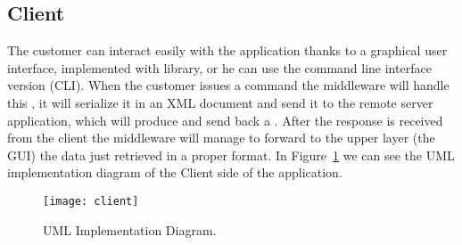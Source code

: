 \subsection{Client}

The customer can interact easily with the application thanks to a graphical user
interface, implemented with  library, or he can use the
command line interface version (CLI). When the customer issues a command the
middleware will handle this , it will serialize it in an
XML document and send it to the remote server application, which will produce
and send back a . After the response is received from the
client the middleware will manage to forward to the upper layer (the GUI) the
data just retrieved in a proper format. In Figure~\ref{fig:client} we can see
the UML implementation diagram of the Client side of the application.

\begin{landscape}
	\begin{figure}
		\texttt{[image: client]}
		\caption{ UML Implementation Diagram.}
		\label{fig:client}
	\end{figure}
\end{landscape}
